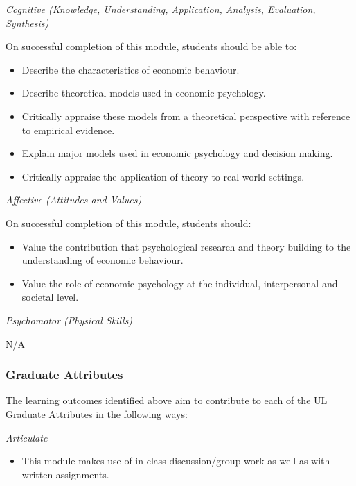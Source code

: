 \documentclass[
  x11names]{article}
\providecommand{\tightlist}{%
  \setlength{\itemsep}{0pt}\setlength{\parskip}{0pt}}
\begin{document}
\bigskip

\emph{Cognitive (Knowledge, Understanding, Application, Analysis,
Evaluation, Synthesis)}

On successful completion of this module, students should be able to:

\begin{itemize}
\tightlist
\item
  Describe the characteristics of economic behaviour.
\item
  Describe theoretical models used in economic psychology.
\item
  Critically appraise these models from a theoretical perspective with
  reference to empirical evidence.
\item
  Explain major models used in economic psychology and decision making.
\item
  Critically appraise the application of theory to real world settings.
\end{itemize}

\bigskip

\emph{Affective (Attitudes and Values)}

On successful completion of this module, students should:

\begin{itemize}
\tightlist
\item
  Value the contribution that psychological research and theory building
  to the understanding of economic behaviour.
\item
  Value the role of economic psychology at the individual, interpersonal
  and societal level.
\end{itemize}

\bigskip

\emph{Psychomotor (Physical Skills)}

N/A

\subsubsection{Graduate Attributes}\label{graduate-attributes}

The learning outcomes identified above aim to contribute to each of the
UL Graduate Attributes in the following ways:

\emph{Articulate}

\begin{itemize}
\tightlist
\item
  This module makes use of in-class discussion/group-work as well as
  with written assignments.
\end{itemize}
\end{document}
